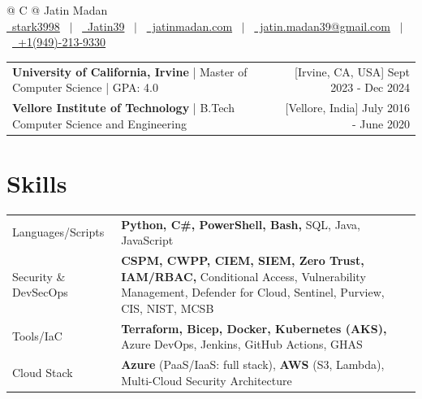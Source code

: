 \documentclass[a4paper,3pt]{article}
\begin{document}
\pagestyle{empty}


\begin{tabularx}{\linewidth}{@{} C @{}}
    \Huge{Jatin Madan}                                                           \\[10.5pt]
    \href{https://github.com/stark3998}{\raisebox{-0.05\height}\faGithub\ stark3998} \ $|$ \
    \href{https://linkedin.com/in/jatin39}{\raisebox{-0.05\height}\faLinkedin\ Jatin39} \ $|$ \
    \href{https://jatinmadan.com}{\raisebox{-0.05\height}\faGlobe \ jatinmadan.com} \ $|$ \
    \href{mailto:jatin.madan39@gmail.com}{\raisebox{-0.05\height}\faEnvelope \ jatin.madan39@gmail.com} \ $|$ \
    \href{tel:+19492139330}{\raisebox{-0.05\height}\faMobile \ +1(949)-213-9330} \\
\end{tabularx}

\begin{tabularx}{\linewidth}{ @{}l r@{} }
    \textbf{University of California, Irvine} | Master of Computer Science | GPA: 4.0            & \hfill [Irvine, CA, USA] Sept 2023 - Dec 2024 \\[2pt]
    \textbf{Vellore Institute of Technology} | B.Tech Computer Science and Engineering & \hfill [Vellore, India] July 2016 - June 2020 \\[2pt]
\end{tabularx}

\section{Skills}
\begin{tabularx}{\linewidth}{@{}l X@{}}
    Languages/Scripts     & \normalsize{\textbf{Python, C\#, PowerShell, Bash,} SQL, Java, JavaScript}\\
    Security \& DevSecOps & \normalsize{\textbf{CSPM, CWPP, CIEM, SIEM, Zero Trust, IAM/RBAC,} Conditional Access, Vulnerability Management, Defender for Cloud, Sentinel, Purview, CIS, NIST, MCSB}\\
    Tools/IaC             & \normalsize{\textbf{Terraform, Bicep, Docker, Kubernetes (AKS),} Azure DevOps, Jenkins, GitHub Actions, GHAS}\\
    Cloud Stack           & \normalsize{\textbf{Azure} (PaaS/IaaS: full stack), \textbf{AWS} (S3, Lambda), Multi-Cloud Security Architecture}\\
\end{tabularx}
\end{document}
